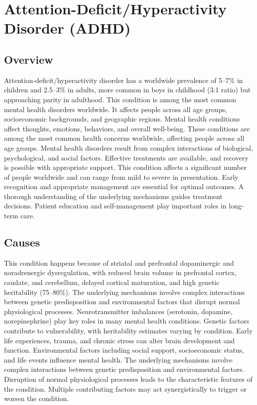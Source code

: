 \chapter{Attention-Deficit/Hyperactivity Disorder (ADHD)}
\label{sec:Attention-Deficit/Hyperactivity Disorder (ADHD)}

\section{Overview}
Attention-deficit/hyperactivity disorder has a worldwide prevalence of 5--7\% in children and 2.5--3\% in adults, more common in boys in childhood (3:1 ratio) but approaching parity in adulthood. This condition is among the most common mental health disorders worldwide. It affects people across all age groups, socioeconomic backgrounds, and geographic regions. Mental health conditions affect thoughts, emotions, behaviors, and overall well-being. These conditions are among the most common health concerns worldwide, affecting people across all age groups. Mental health disorders result from complex interactions of biological, psychological, and social factors. Effective treatments are available, and recovery is possible with appropriate support. This condition affects a significant number of people worldwide and can range from mild to severe in presentation. Early recognition and appropriate management are essential for optimal outcomes. A thorough understanding of the underlying mechanisms guides treatment decisions. Patient education and self-management play important roles in long-term care.
\section{Causes}
This condition happens because of striatal and prefrontal dopaminergic and noradrenergic dysregulation, with reduced brain volume in prefrontal cortex, caudate, and cerebellum, delayed cortical maturation, and high genetic heritability (75--80\%). The underlying mechanisms involve complex interactions between genetic predisposition and environmental factors that disrupt normal physiological processes. Neurotransmitter imbalances (serotonin, dopamine, norepinephrine) play key roles in many mental health conditions. Genetic factors contribute to vulnerability, with heritability estimates varying by condition. Early life experiences, trauma, and chronic stress can alter brain development and function. Environmental factors including social support, socioeconomic status, and life events influence mental health. The underlying mechanisms involve complex interactions between genetic predisposition and environmental factors. Disruption of normal physiological processes leads to the characteristic features of the condition. Multiple contributing factors may act synergistically to trigger or worsen the condition.
